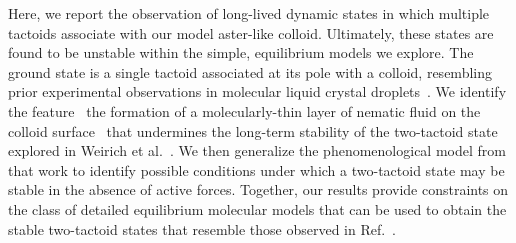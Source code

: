 \documentclass[%
 aip,
 amsmath,amssymb,
 reprint,%
]{revtex4-1}
\begin{document}
Here, we report the observation of long-lived dynamic states in which multiple tactoids associate with our model aster-like colloid. Ultimately, these states are found to be unstable within the simple, equilibrium models we explore.  The ground state is a single tactoid associated at its pole with a colloid, resembling prior experimental observations in molecular liquid crystal droplets~\cite{Abbott13,Whitmer13,Abbott14,Rahimi2015}. We identify the feature \textendash\, the formation of a molecularly-thin layer of nematic fluid on the colloid surface \textendash\, that undermines the long-term stability of the two-tactoid state explored in Weirich et al.~\cite{Weirich19}.  We then generalize the phenomenological model from that work to identify possible conditions under which a two-tactoid state may be stable in the absence of active forces. Together, our results provide constraints on the class of detailed equilibrium molecular models that can be used to obtain the stable two-tactoid states that resemble those observed in Ref.~.
\end{document}

